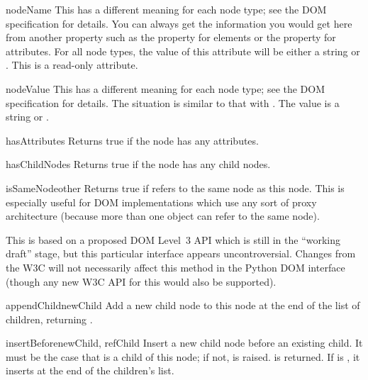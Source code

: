\begin{memberdesc}[Node]{nodeName}
This has a different meaning for each node type; see the DOM
specification for details.  You can always get the information you
would get here from another property such as the 
property for elements or the  property for attributes.
For all node types, the value of this attribute will be either a
string or .  This is a read-only attribute.
\end{memberdesc}

\begin{memberdesc}[Node]{nodeValue}
This has a different meaning for each node type; see the DOM
specification for details.  The situation is similar to that with
.  The value is a string or .
\end{memberdesc}

\begin{methoddesc}[Node]{hasAttributes}{}
Returns true if the node has any attributes.
\end{methoddesc}

\begin{methoddesc}[Node]{hasChildNodes}{}
Returns true if the node has any child nodes.
\end{methoddesc}

\begin{methoddesc}[Node]{isSameNode}{other}
Returns true if  refers to the same node as this node.
This is especially useful for DOM implementations which use any sort
of proxy architecture (because more than one object can refer to the
same node).

\begin{notice}
  This is based on a proposed DOM Level~3 API which is still in the
  ``working draft'' stage, but this particular interface appears
  uncontroversial.  Changes from the W3C will not necessarily affect
  this method in the Python DOM interface (though any new W3C API for
  this would also be supported).
\end{notice}
\end{methoddesc}

\begin{methoddesc}[Node]{appendChild}{newChild}
Add a new child node to this node at the end of the list of children,
returning .
\end{methoddesc}

\begin{methoddesc}[Node]{insertBefore}{newChild, refChild}
Insert a new child node before an existing child.  It must be the case
that  is a child of this node; if not,
 is raised.   is returned. If
 is , it inserts  at the end of
the children's list.
\end{methoddesc}


